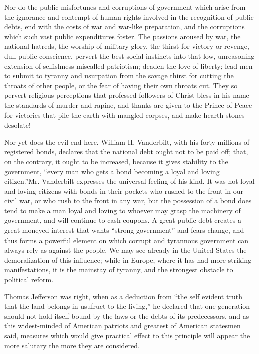\documentclass{book}
\begin{document}
Nor do the public misfortunes and corruptions of government which arise from the ignorance and contempt of human rights involved in the recognition of public debts, end with the costs of war and war-like preparation, and the corruptions which such vast public expenditures foster. The passions aroused by war, the national hatreds, the worship of military glory, the thirst for victory or revenge, dull public conscience, pervert the best social instincts into that low, unreasoning extension of selfishness miscalled patriotism; deaden the love of liberty; lead men to submit to tyranny and usurpation from the savage thirst for cutting the throats of other people, or the fear of having their own throats cut. They so pervert religious perceptions that professed followers of Christ bless in his name the standards of murder and rapine, and thanks are given to the Prince of Peace for victories that pile the earth with mangled corpses, and make hearth-stones desolate!

Nor yet does the evil end here. William H. Vanderbilt, with his forty millions of registered bonds, declares that the national debt ought not to be paid off; that, on the contrary, it ought to be increased, because it gives stability to the government, “every man who gets a bond becoming a loyal and loving citizen.”\footnotemark[1] Mr. Vanderbilt expresses the universal feeling of his kind. It was not loyal and loving citizens with bonds in their pockets who rushed to the front in our civil war, or who rush to the front in any war, but the possession of a bond does tend to make a man loyal and loving to whoever may grasp the machinery of government, and will continue to cash coupons. A great public debt creates a great moneyed interest that wants “strong government” and fears change, and thus forms a powerful element on which corrupt and tyrannous government can always rely as against the people. We may see already in the United States the demoralization of this influence; while in Europe, where it has had more striking manifestations, it is the mainstay of tyranny, and the strongest obstacle to political reform.

Thomas Jefferson was right, when as a deduction from “the self evident truth that the land belongs in usufruct to the living,” he declared that one generation should not hold itself bound by the laws or the debts of its predecessors, and as this widest-minded of American patriots and greatest of American statesmen said, measures which would give practical effect to this principle will appear the more salutary the more they are considered.
\end{document}
